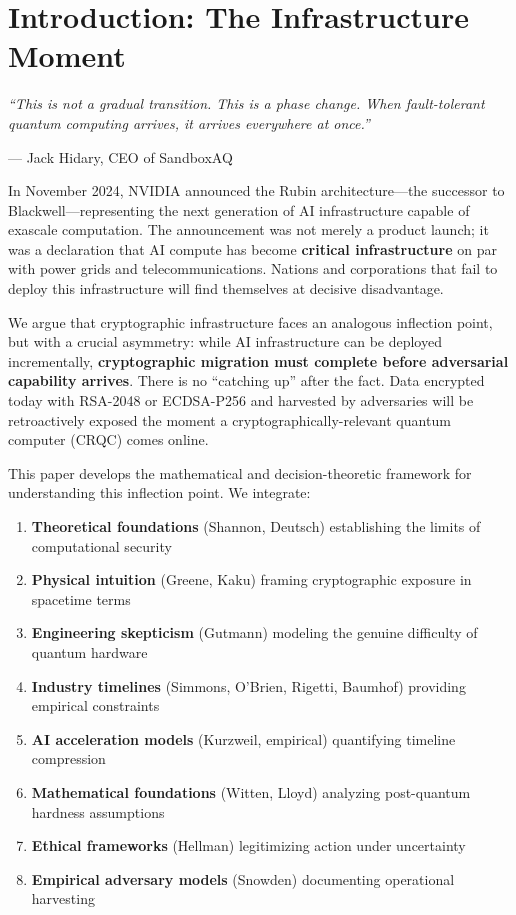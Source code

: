 \documentclass[11pt,a4paper]{article}
\begin{document}
\section{Introduction: The Infrastructure Moment}

\epigraph{\textit{``This is not a gradual transition. This is a phase change. When fault-tolerant quantum computing arrives, it arrives everywhere at once.''}}{--- Jack Hidary, CEO of SandboxAQ}

In November 2024, NVIDIA announced the Rubin architecture---the successor to Blackwell---representing the next generation of AI infrastructure capable of exascale computation. The announcement was not merely a product launch; it was a declaration that AI compute has become \textbf{critical infrastructure} on par with power grids and telecommunications. Nations and corporations that fail to deploy this infrastructure will find themselves at decisive disadvantage.

We argue that cryptographic infrastructure faces an analogous inflection point, but with a crucial asymmetry: while AI infrastructure can be deployed incrementally, \textbf{cryptographic migration must complete before adversarial capability arrives}. There is no ``catching up'' after the fact. Data encrypted today with RSA-2048 or ECDSA-P256 and harvested by adversaries will be retroactively exposed the moment a cryptographically-relevant quantum computer (CRQC) comes online.

This paper develops the mathematical and decision-theoretic framework for understanding this inflection point. We integrate:
\begin{enumerate}[noitemsep]
    \item \textbf{Theoretical foundations} (Shannon, Deutsch) establishing the limits of computational security
    \item \textbf{Physical intuition} (Greene, Kaku) framing cryptographic exposure in spacetime terms
    \item \textbf{Engineering skepticism} (Gutmann) modeling the genuine difficulty of quantum hardware
    \item \textbf{Industry timelines} (Simmons, O'Brien, Rigetti, Baumhof) providing empirical constraints
    \item \textbf{AI acceleration models} (Kurzweil, empirical) quantifying timeline compression
    \item \textbf{Mathematical foundations} (Witten, Lloyd) analyzing post-quantum hardness assumptions
    \item \textbf{Ethical frameworks} (Hellman) legitimizing action under uncertainty
    \item \textbf{Empirical adversary models} (Snowden) documenting operational harvesting
\end{enumerate}
\end{document}
